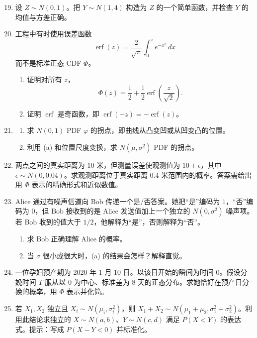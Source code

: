 \documentclass[UTF8, 12pt, fontset=fandol, oneside]{ctexart}
\begin{document}
\begin{enumerate}
  \setcounter{enumi}{18}
  \item 设 $Z\sim N(0,1)$。把 $Y\sim N(1,4)$ 构造为 $Z$ 的一个简单函数，并检查 $Y$ 的均值与方差正确。

  \item 工程中有时使用误差函数
  \[
    \operatorname{erf}(z)=\frac{2}{\sqrt{\pi}}\int_0^z e^{-x^2}\,dx
  \]
  而不是标准正态 CDF $\Phi$。
  \begin{enumerate}
    \item 证明对所有 $z$，
    \[
      \Phi(z)=\frac12+\frac12\operatorname{erf}\left(\frac{z}{\sqrt2}\right).
    \]
    \item 证明 $\operatorname{erf}$ 是奇函数，即 $\operatorname{erf}(-z)=-\operatorname{erf}(z)$。
  \end{enumerate}

  \item 
  \begin{enumerate}
    \item 求 $N(0,1)$ PDF $\varphi$ 的拐点，即曲线从凸变凹或从凹变凸的位置。
    \item 利用 (a) 和位置尺度变换，求 $N(\mu,\sigma^2)$ PDF 的拐点。
  \end{enumerate}

  \item 两点之间的真实距离为 $10$ 米，但测量误差使观测值为 $10+\epsilon$，其中 $\epsilon\sim N(0,0.04)$。求观测距离位于真实距离 $0.4$ 米范围内的概率。答案需给出用 $\Phi$ 表示的精确形式和近似数值。

  \item Alice 通过有噪声信道向 Bob 传递一个是/否答案。她把“是”编码为 $1$，“否”编码为 $0$，但 Bob 接收到的是 Alice 发送值加上一个独立的 $N(0,\sigma^2)$ 噪声项。若 Bob 收到的值大于 $1/2$，他解释为“是”，否则解释为“否”。
  \begin{enumerate}
    \item 求 Bob 正确理解 Alice 的概率。
    \item 当 $\sigma$ 很小或很大时，(a) 的结果会怎样？解释直觉。
  \end{enumerate}

  \item 一位孕妇预产期为 2020 年 1 月 10 日。以该日开始的瞬间为时间 $0$。假设分娩时间 $T$ 服从以 $0$ 为中心、标准差为 $8$ 天的正态分布。求她恰好在预产日分娩的概率，用 $\Phi$ 表示并化简。

  \item 若 $X_1,X_2$ 独立且 $X_i\sim N(\mu_i,\sigma_i^2)$，则 $X_1+X_2\sim N(\mu_1+\mu_2,\sigma_1^2+\sigma_2^2)$。利用此结论求独立的 $X\sim N(a,b)$、$Y\sim N(c,d)$ 满足 $P(X<Y)$ 的表达式。提示：写成 $P(X-Y<0)$ 并标准化。


\end{enumerate}
\end{document}
